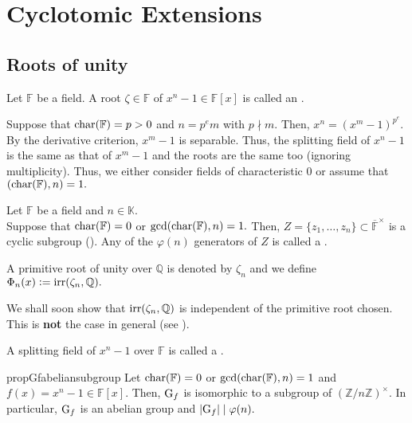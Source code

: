 \chapter{Cyclotomic Extensions}

\section{Roots of unity}

\begin{defn}%
    Let $\mathbb{F}$ be a field. A root $\zeta \in \mathbb{F}$ of $x^n - 1 \in \mathbb{F}[x]$ is called an .
\end{defn}

\begin{rem}
    Suppose that $\operatorname{char}(\mathbb{F}) = p > 0$ and $n = p^em$ with $p \nmid m.$ Then, $x^n = (x^m - 1)^{p^e}.$ By the derivative criterion, $x^m - 1$ is separable. Thus, the splitting field of $x^n - 1$ is the same as that of $x^m - 1$ and the roots are the same too (ignoring multiplicity). Thus, we either consider fields of characteristic $0$ or assume that $(\operatorname{char}(\mathbb{F}), n) = 1.$
\end{rem}

\begin{defn}%
    Let $\mathbb{F}$ be a field and $n \in \mathbb{K}.$ \\
    Suppose that $\operatorname{char}(\mathbb{F}) = 0$ or $\gcd(\operatorname{char}(\mathbb{F}), n) = 1.$ Then, $Z = \{z_1, \ldots, z_n\} \subset \overline{\mathbb{F}}^\times$ is a cyclic subgroup (). Any of the $\varphi(n)$ generators of $Z$ is called a .

    A primitive root of unity over $\mathbb{Q}$ is denoted by $\zeta_n$ and we define $\Phi_n(x) \vcentcolon= \operatorname{irr}(\zeta_n, \mathbb{Q}).$ 
\end{defn}

\begin{rem}
    We shall soon show that $\operatorname{irr}(\zeta_n, \mathbb{Q})$ is independent of the primitive root chosen. This is \textbf{not} the case in general (see ).
\end{rem}

\begin{defn}%
    A splitting field of $x^n - 1$ over $\mathbb{F}$ is called a .
\end{defn}

\begin{restatable}[]{prop}{Gfabeliansubgroup}
\label{prop:Gfabeliansubgroup}
    Let $\operatorname{char}(\mathbb{F}) = 0$ or $\gcd(\operatorname{char}(\mathbb{F}), n) = 1$ and $f(x) = x^n - 1 \in \mathbb{F}[x].$ Then, $\operatorname{G}_f$ is isomorphic to a subgroup of $(\mathbb{Z}/n\mathbb{Z})^\times.$ In particular, $\operatorname{G}_f$ is an abelian group and ${\left\lvert \operatorname{G}_f \right\lvert} \mid \varphi(n).$ \hfill\hyperref[prop:Gfabeliansubgroup2]{\downsym}
\end{restatable}

